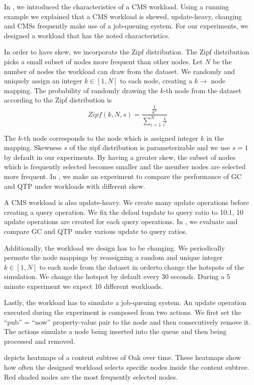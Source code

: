 \documentclass[abstracton,12pt]{scrartcl}
\theoremstyle{definition}
\begin{document}
In , we introduced the characteristics of a CMS
workload. Using a running example we explained that a CMS workload is skewed,
update-heavy, changing and CMSs frequently make use of a job-queuing system.
For our experiments, we designed a workload that has the noted characteristics.

In order to have skew, we incorporate the Zipf distribution. The Zipf
distribution picks a small subset of nodes more frequent than other nodes. 
Let $N$ be the number of nodes the workload can draw from the dataset.
We randomly and uniquely assign an integer $k \in [1, N]$ to each node, creating 
a  $k \rightarrow$ node mapping. The probability of randomly drawing the $k$-th node 
from the dataset according to the Zipf distribution is
$$ Zipf(k,N,s) = \frac{\frac{1}{k^s}}{\sum_{i=1}^{N}\frac{1}{i^s}} $$

The $k$-th node corresponds to the node which is assigned integer $k$ in the mapping.
Skewness $s$ of the zipf distribution is parameterizable and we use $s=1$ by
default in our experiments. By having a greater skew, the subset of nodes which
is frequently selected becomes smaller and the member nodes are selected more
frequent. In , we make an experiment to compare the performance
of GC and QTP under workloads with different skew.

A CMS workload is also update-heavy. We create many update operations before
creating a query operation. We fix the defaul tupdate to query ratio to 10:1, 10 update
operations are created for each query operations. In
, we evaluate and compare GC and QTP under various
update to query ratios.

Additionally, the workload we design has to be changing. We periodically permute 
the node mappings by reassigning a random and unique integer $k \in [1,N]$ to each
node from the dataset in orderto change the hotspots of the simulation. 
We change the hotspot by default every 30 seconds. During a 5 minute
experiment we expect 10 different workloads.

Lastly, the workload has to simulate a job-queuing system. An update operation
executed  during the experiment is composed from two actions. We first set the
``pub'' = ``now'' property-value pair to the node and then consecutively remove
it. The actions simulate a node being inserted into the queue and then being
processed and removed.

 depicts heatmaps of a content subtree of Oak over time.
These heatmaps show how often the designed workload selects specific nodes
inside the content subtree. Red shaded nodes are the most frequently selected nodes.
\end{document}
